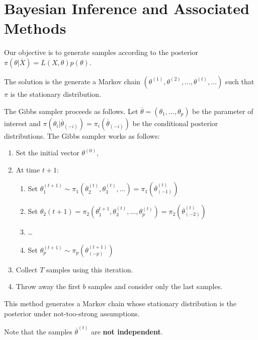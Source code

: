 \section{Bayesian Inference and Associated Methods}
\label{sec:bayes-infer-assoc}

\begin{defn}
  \label{sec:bayes-infer-assoc-1}
  Our objective is to generate samples according to the posterior
  $\pi(\theta | \overline X) = L(X, \theta) p(\theta)$.

  The solution is the generate a Markov chain $(\theta^{(1)},
  \theta^{(2)}, \dots, \theta^{(t)}, \dots)$ such that $\pi$ is the
  stationary distribution.
\end{defn}

\begin{defn}
  \label{sec:bayes-infer-assoc-2}
  The Gibbs sampler proceeds as follows. Let $\overline \theta =
  (\theta_{1}, \dots, \theta_{p})$ be the parameter of interest and
  $\pi(\theta_{i} | \overline \theta_{(-i)}) = \pi_{i}(\overline
  \theta_{(-i)})$ be the conditional posterior distributions. The
  Gibbs sampler works as follows:
  \begin{enumerate}
  \item Set the initial vector $\theta^{(0)}$,
  \item At time $t+1$:
    \begin{enumerate}
    \item Set $\theta_{1}^{(t+1)} \sim \pi_{1}(\theta_{2}^{(t)},
      \theta_{3}^{(t)}, \dots) = \pi_{1}(\overline \theta^{(t)}_{(-1)})$
    \item Set $\theta_{2}(t+1) = \pi_{2}(\theta_{1}^{t+1},
      \theta_{3}^{(t)}, \dots, \theta_{p}^{(t)}) =  \pi_{2}(\overline
      \theta^{(t)}_{(-2)})$
    \item \dots
    \item Set $\theta_{p}^{(t+1)} \sim \pi_{p}(\theta^{(t+1)}_{(-p)})$
    \end{enumerate}
  \item Collect $T$ samples using this iteration.
  \item Throw away the first $b$ samples and consider only the last samples.
  \end{enumerate}

  This method generates a Markov chain whose stationary distribution
  is the posterior under not-too-strong assumptions.

  Note that the samples $\overline \theta^{(t)}$ are \textbf{not independent}.
\end{defn}


